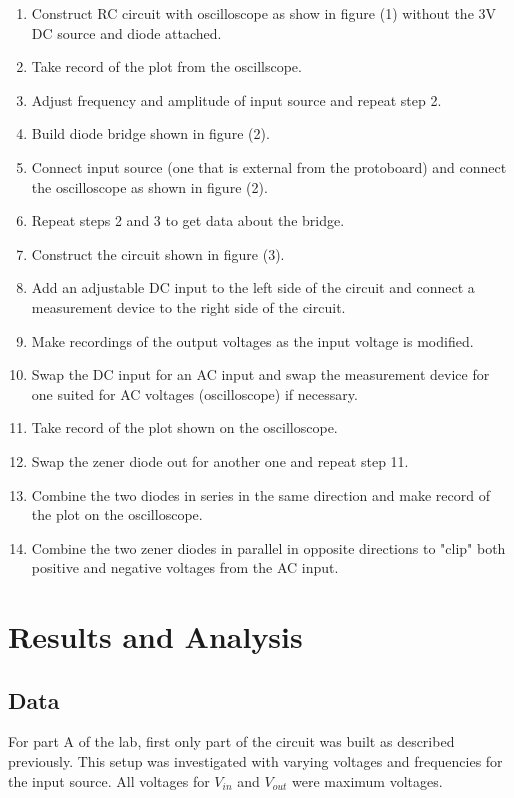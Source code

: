 \documentclass[twocolumn, amsmath]{revtex4}
\begin{document}
\begin{enumerate}
    \item Construct RC circuit with oscilloscope as show in figure (1) without the 3V DC source and diode attached.
    \item Take record of the plot from the oscillscope.
    \item Adjust frequency and amplitude of input source and repeat step 2.
    \item Build diode bridge shown in figure (2).
    \item Connect input source (one that is external from the protoboard) and connect the oscilloscope as shown in figure (2).
    \item Repeat steps 2 and 3 to get data about the bridge.
    \item Construct the circuit shown in figure (3).
    \item Add an adjustable DC input to the left side of the circuit and connect a measurement device to the right side of the circuit.
    \item Make recordings of the output voltages as the input voltage is modified.
    \item Swap the DC input for an AC input and swap the measurement device for one suited for AC voltages (oscilloscope) if necessary.
    \item Take record of the plot shown on the oscilloscope.
    \item Swap the zener diode out for another one and repeat step 11.
    \item Combine the two diodes in series in the same direction and make record of the plot on the oscilloscope.
    \item Combine the two zener diodes in parallel in opposite directions to "clip" both positive and negative voltages from the AC input.
\end{enumerate}


\section{Results and Analysis}

\subsection{Data}
For part A of the lab, first only part of the circuit was built as described previously. This setup was investigated with varying voltages and frequencies for the input source. All voltages for $V_{in}$ and $V_{out}$ were maximum voltages.
\end{document}
